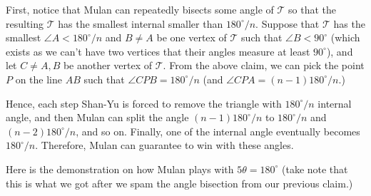 \documentclass[11pt]{article}
\begin{document}
\noindent
First, notice that Mulan can repeatedly bisects some angle of $\mathcal{T}$ so that the resulting $\mathcal{T}$ has the smallest internal smaller than $180^{\circ}/n$. Suppose that $\mathcal{T}$ has the smallest $\angle{A}<180^{\circ}/n$ and $B\neq A$ be one vertex of $\mathcal{T}$ such that $\angle{B}<90^{\circ}$ (which exists as we can't have two vertices that their angles measure at least $90^{\circ}$), and let $C\neq A,B$ be another vertex of $\mathcal{T}$. From the above claim, we can pick the point $P$ on the line $AB$ such that $\angle{CPB}=180^{\circ}/n$ (and $\angle{CPA}=(n-1)180^{\circ}/n$.)

\medskip
Hence, each step Shan-Yu is forced to remove the triangle with $180^{\circ}/n$ internal angle, and then Mulan can split the angle $(n-1)180^{\circ}/n$ to $180^{\circ}/n$ and $(n-2)180^{\circ}/n$, and so on. Finally, one of the internal angle eventually becomes $180^{\circ}/n$. Therefore, Mulan can guarantee to win with these angles.

\medskip
Here is the demonstration on how Mulan plays with $5\theta=180^{\circ}$ (take note that this is what we got after we spam the angle bisection from our previous claim.)
\end{document}
